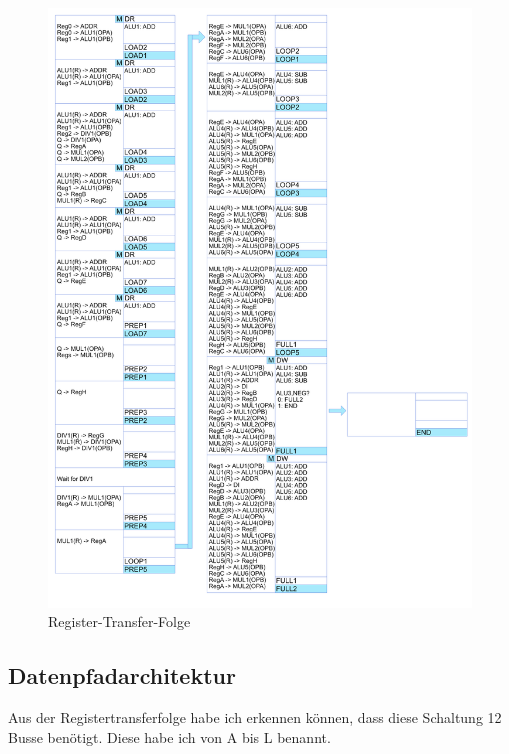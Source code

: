 \documentclass{article}
\begin{document}
    \begin{figure}
        \includegraphics[width=\textwidth]{../Diagramme/RegisterTransferfolge/RegisterTransferFolgeKomplett.png}
        \caption{Register-Transfer-Folge}
        \label{RT-Folge}
    \end{figure}

    \subsection{Datenpfadarchitektur}

    Aus der Registertransferfolge habe ich erkennen können, dass diese Schaltung 12 Busse benötigt.
    Diese habe ich von A bis L benannt.

\end{document}
